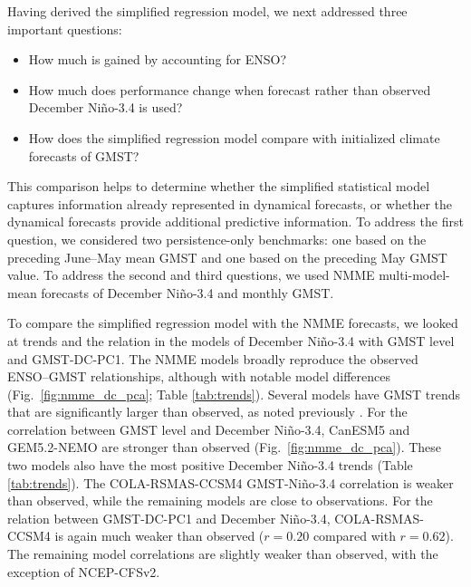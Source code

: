\documentclass[draft]{agujournal2019}
\begin{document}
Having derived the simplified regression model, we next addressed three important questions: \begin{itemize} \item How much is gained by accounting for ENSO?  \item How much does performance change when forecast rather than observed December Ni\~no-3.4 is used?  \item How does the simplified regression model compare with initialized climate forecasts of GMST? \end{itemize} This comparison helps to determine whether the simplified statistical model captures information already represented in dynamical forecasts, or whether the dynamical forecasts provide additional predictive information. To address the first question, we considered two persistence-only benchmarks: one based on the preceding June--May mean GMST and one based on the preceding May GMST value. To address the second and third questions, we used NMME multi-model-mean forecasts of December Ni\~no-3.4 and monthly GMST.

To compare the simplified regression model with the NMME forecasts, we looked at trends and the relation in the models of December Ni\~no-3.4 with GMST level and GMST-DC-PC1. The NMME models broadly reproduce the observed ENSO--GMST relationships, although with notable model differences (Fig.\ \ref{fig:nmme_dc_pca}; Table \ref{tab:trends}). Several models have GMST trends that are significantly larger than observed, as noted previously \cite{Delsole2025diagnosing,Swart2019canadian,Tippett2024trends}. For the correlation between GMST level and December Ni\~no-3.4, CanESM5 and GEM5.2-NEMO are stronger than observed (Fig.\ \ref{fig:nmme_dc_pca}).  These two models also have the most positive December Ni\~no-3.4 trends (Table \ref{tab:trends}). The COLA-RSMAS-CCSM4 GMST-Ni\~no-3.4 correlation is weaker than observed, while the remaining models are close to observations. For the relation between GMST-DC-PC1 and December Ni\~no-3.4, COLA-RSMAS-CCSM4 is again much weaker than observed ($r=0.20$ compared with $r=0.62$). The remaining model correlations are slightly weaker than observed, with the exception of NCEP-CFSv2.
\end{document}
